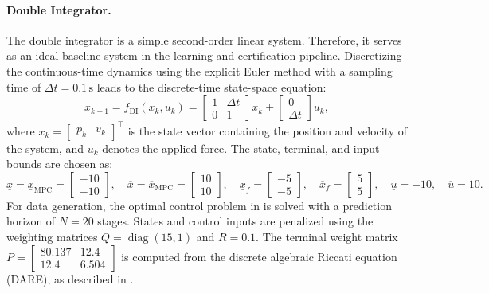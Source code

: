\paragraph{Double Integrator.}
The double integrator is a simple second-order linear system. Therefore, it serves as an ideal baseline 
system in the learning and certification pipeline. Discretizing the continuous-time dynamics using the 
explicit Euler method with a sampling time of $\Delta t = 0.1\,\text{s}$ leads to the discrete-time state-space equation:
\begin{equation}
    \label{eq:double-integrator}
    x_{k+1} = f_{\mathrm{DI}}(x_k, u_k) = \begin{bmatrix}1 & \Delta t \\
    0 & 1\end{bmatrix} x_k + \begin{bmatrix}0 \\ \Delta t\end{bmatrix} u_k,
\end{equation}
where $x_k = \begin{bmatrix}p_k & v_k\end{bmatrix}^\top$ is the state vector containing the position and velocity of the system, 
and $u_k$ denotes the applied force. 
The state, terminal, and input bounds are chosen as:
\begin{equation*}
    \underline{x} = \underline{x}_{\mathrm{MPC}} = \begin{bmatrix} -10 \\ -10 \end{bmatrix}, \quad
    \overline{x}  = \overline{x}_{\mathrm{MPC}} = \begin{bmatrix} 10 \\ 10 \end{bmatrix}, \quad
    \underline{x}_f = \begin{bmatrix} -5 \\ -5 \end{bmatrix}, \quad
    \overline{x}_f  = \begin{bmatrix} 5 \\ 5 \end{bmatrix}, \quad
    \underline{u} = -10, \quad
    \overline{u}  = 10.
\end{equation*}
For data generation, the optimal control problem in  is solved with a prediction horizon of $N = 20$ stages. 
States and control inputs are penalized using the weighting matrices $Q = \operatorname{diag}(15, 1)$ and $R = 0.1$. 
The terminal weight matrix $P = \begin{bmatrix} 80.137 & 12.4 \\ 12.4 & 6.504 \end{bmatrix}$ is computed from the discrete algebraic Riccati equation (DARE), 
as described in . 


